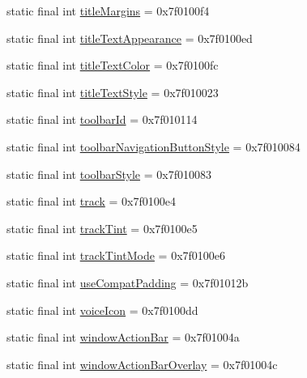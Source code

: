 \begin{CompactItemize}
\item 
static final int \hyperlink{classandroid_1_1support_1_1v7_1_1appcompat_1_1_r_1_1attr_de3496ec2c8f2f2fe2b8754c05a7cb72}{titleMargins} = 0x7f0100f4
\item 
static final int \hyperlink{classandroid_1_1support_1_1v7_1_1appcompat_1_1_r_1_1attr_6f05d0e74c02a71af70bfc9a39bd130e}{titleTextAppearance} = 0x7f0100ed
\item 
static final int \hyperlink{classandroid_1_1support_1_1v7_1_1appcompat_1_1_r_1_1attr_2f894be8b685eca1a17462846085cf18}{titleTextColor} = 0x7f0100fc
\item 
static final int \hyperlink{classandroid_1_1support_1_1v7_1_1appcompat_1_1_r_1_1attr_2eea3dc90aef80e307b14ccec789e201}{titleTextStyle} = 0x7f010023
\item 
static final int \hyperlink{classandroid_1_1support_1_1v7_1_1appcompat_1_1_r_1_1attr_0850df25aa8c8f7c36ac62b4c864c186}{toolbarId} = 0x7f010114
\item 
static final int \hyperlink{classandroid_1_1support_1_1v7_1_1appcompat_1_1_r_1_1attr_0524798523ac1e8fde77cbb40f45e5b3}{toolbarNavigationButtonStyle} = 0x7f010084
\item 
static final int \hyperlink{classandroid_1_1support_1_1v7_1_1appcompat_1_1_r_1_1attr_9d90ea7a5d18174233971318773d0703}{toolbarStyle} = 0x7f010083
\item 
static final int \hyperlink{classandroid_1_1support_1_1v7_1_1appcompat_1_1_r_1_1attr_1c6c319b2b5a130b26a8bdc55da06266}{track} = 0x7f0100e4
\item 
static final int \hyperlink{classandroid_1_1support_1_1v7_1_1appcompat_1_1_r_1_1attr_3690d36eb6dbd4c35f116ac1dd3fce4e}{trackTint} = 0x7f0100e5
\item 
static final int \hyperlink{classandroid_1_1support_1_1v7_1_1appcompat_1_1_r_1_1attr_31919f6aca37687800f23033ff6ebc51}{trackTintMode} = 0x7f0100e6
\item 
static final int \hyperlink{classandroid_1_1support_1_1v7_1_1appcompat_1_1_r_1_1attr_8ab9cb4866374a553554660cceb961f6}{useCompatPadding} = 0x7f01012b
\item 
static final int \hyperlink{classandroid_1_1support_1_1v7_1_1appcompat_1_1_r_1_1attr_56dc2a1b9a398b72b473c01c01eb0a90}{voiceIcon} = 0x7f0100dd
\item 
static final int \hyperlink{classandroid_1_1support_1_1v7_1_1appcompat_1_1_r_1_1attr_b64ba8da5b46df4096699bfa67d51c9f}{windowActionBar} = 0x7f01004a
\item 
static final int \hyperlink{classandroid_1_1support_1_1v7_1_1appcompat_1_1_r_1_1attr_f2feda86cff0b8afd2fc04e62d9c4d49}{windowActionBarOverlay} = 0x7f01004c

\end{CompactItemize}
